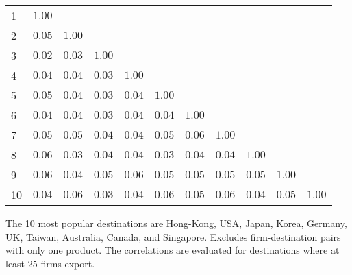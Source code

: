 \documentclass{article}
\begin{document}
\begin{table}[h]
{\begin{threeparttable}
\begin{tabular}{lrrrrrrrrrr}
\cmidrule{2-11} 
1  & $1.00$    &              &             &             &              &            &               &            &              &                        \\  
2  & $0.05$    & $1.00$     &             &             &              &            &               &            &              &                        \\  
3  & $0.02$    & $0.03$     & $1.00$    &             &              &            &               &            &              &                        \\  
4  & $0.04$    & $0.04$     & $0.03$    &  $1.00$   &              &            &               &            &              &                        \\  
5  & $0.05$    & $0.04$     & $0.03$    &  $0.04$   & $1.00$     &            &               &            &              &                        \\  
6  & $0.04$    & $0.04$     & $0.03$    &  $0.04$   & $0.04$     &  $1.00$  &               &            &              &                        \\  
7  & $0.05$    & $0.05$     & $0.04$    &  $0.04$   & $0.05$     &  $0.06$  &  $1.00$     &            &              &                        \\  
8  & $0.06$    & $0.03$     & $0.04$    &  $0.04$   & $0.03$     &  $0.04$  &  $0.04$     & $1.00$   &              &                        \\  
9  & $0.06$    & $0.04$     & $0.05$    &  $0.06$   & $0.05$     &  $0.05$  &  $0.05$     & $0.05$   & $1.00$     &                        \\  
10 & $0.04$   & $0.06$    & $0.03$   &  $0.04$  & $0.06$    &  $0.05$ &  $0.06$    & $0.04$  & $0.05$    &   $1.00$           \\  
\hline
\hline
\end{tabular}
\begin{tablenotes}
\small
\item  \noindent  \footnotesize{The 10 most popular destinations are Hong-Kong, USA, Japan, Korea, Germany, UK, Taiwan, Australia, Canada, and Singapore. Excludes firm-destination pairs with only one product. The correlations are evaluated for destinations where at least 25 firms export.}
\end{tablenotes}
\end{threeparttable}
}
\end{table}
\end{document}
